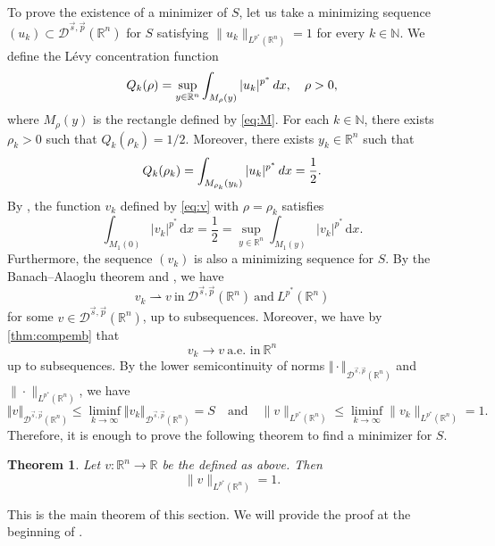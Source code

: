 \documentclass[11pt]{amsart}
\theoremstyle{plain}
\newtheorem{theorem}{Theorem}[section]
\theoremstyle{definition}
\numberwithin{equation}{section}
\renewcommand{\d}{\textnormal{d}}
\newcommand{\N}{\mathbb{N}}
\newcommand{\R}{\mathbb{R}}
\newcommand{\Dsp}{\mathcal{D}^{\vec{s},\vec{p}}(\mathbb{R}^n)}
\begin{document}
To prove the existence of a minimizer of $S$, let us take a minimizing sequence $(u_k) \subset \Dsp$ for $S$ satisfying $\|u_k\|_{L^{p^{\ast}}(\mathbb{R}^n)} = 1$ for every $k \in \N$. We define the L\'evy concentration function
\begin{equation*}
Q_k(\rho) = \sup_{y \in \mathbb{R}^n} \int_{M_{\rho}(y)} |u_k|^{p^{\ast}} \, \d x, \quad \rho > 0,
\end{equation*}
where $M_{\rho}(y)$ is the rectangle defined by \eqref{eq:M}. For each $k \in \mathbb{N}$, there exists $\rho_k > 0$ such that $Q_k(\rho_k)=1/2$. Moreover, there exists $y_k \in \mathbb{R}^n$ such that
\begin{equation*}
Q_k(\rho_k) = \int_{M_{\rho_k}(y_k)} |u_k|^{p^{\ast}} \, \d x = \frac{1}{2}.
\end{equation*}
By , the function $v_k$ defined by \eqref{eq:v} with $\rho=\rho_k$ satisfies
\begin{equation} \label{eq:sup}
\int_{M_1(0)} |v_k|^{p^{\ast}} \,\mathrm{d}x = \frac{1}{2} = \sup_{y \in \mathbb{R}^n} \int_{M_1(y)} |v_k|^{p^{\ast}} \,\mathrm{d}x.
\end{equation}
Furthermore, the sequence $(v_k)$ is also a minimizing sequence for $S$. By the Banach–Alaoglu theorem and , we have
\begin{equation} \label{eq:conv_Dsp}
v_k \rightharpoonup v ~ \text{in}~ \Dsp ~\text{and}~ L^{p^{\ast}}(\mathbb{R}^n)
\end{equation}
for some $v \in \Dsp$, up to subsequences. Moreover, we have by  \autoref{thm:compemb} that 
\begin{equation} \label{eq:conv_ptwise}
v_k \to v ~ \text{a.e. in}~ \mathbb{R}^n
\end{equation}
up to subsequences. By the lower semicontinuity of norms $\Vert\cdot\Vert_{\Dsp}$ and $\|\cdot\|_{L^{p^{\ast}}(\mathbb{R}^n)}$, we have
\begin{equation} \label{eq:lower_semicont}
\Vert v\Vert_{\Dsp} \leq \liminf_{k\to\infty} \Vert v_k\Vert_{\Dsp} = S \quad\text{and}\quad \|v\|_{L^{p^{\ast}}(\mathbb{R}^n)} \leq \liminf_{k\to\infty} \|v_k\|_{L^{p^{\ast}}(\mathbb{R}^n)} = 1.
\end{equation}
Therefore, it is enough to prove the following theorem to find a minimizer for $S$.
\begin{theorem} \label{thm:unit_norm}
Let $v:\R^n\to\R$ be the defined as above. Then
\[\|v\|_{L^{p^{\ast}}(\mathbb{R}^n)} = 1.\]
\end{theorem}
This is the main theorem of this section. We will provide the proof at the beginning of .
\end{document}

